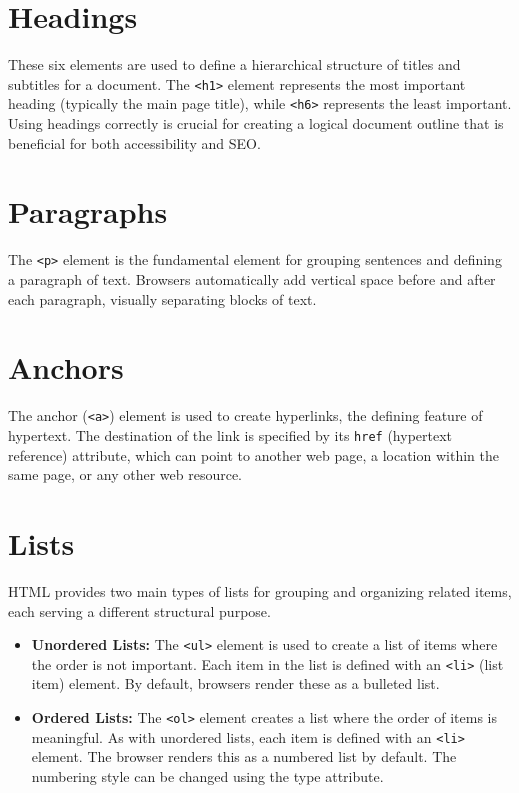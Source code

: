 \documentclass{scrbook}
\begin{document}
\section{Headings}

These six elements are used to define a hierarchical structure of titles and subtitles for a document. The \texttt{<h1>} element represents the most important heading (typically the main page title), while \texttt{<h6>} represents the least important. Using headings correctly is crucial for creating a logical document outline that is beneficial for both accessibility and SEO.

\section{Paragraphs}

The \texttt{<p>} element is the fundamental element for grouping sentences and defining a paragraph of text. Browsers automatically add vertical space before and after each paragraph, visually separating blocks of text.

\section{Anchors}

The anchor (\texttt{<a>}) element is used to create hyperlinks, the defining feature of hypertext. The destination of the link is specified by its \texttt{href} (hypertext reference) attribute, which can point to another web page, a location within the same page, or any other web resource.

\section{Lists}

HTML provides two main types of lists for grouping and organizing related items, each serving a different structural purpose.

\begin{itemize}
    \item
    \textbf{Unordered Lists:} The \texttt{<ul>} element is used to create a list of items where the order is not important. Each item in the list is defined with an \texttt{<li>} (list item) element. By default, browsers render these as a bulleted list.

    \item
    \textbf{Ordered Lists:} The \texttt{<ol>} element creates a list where the order of items is meaningful. As with unordered lists, each item is defined with an \texttt{<li>} element. The browser renders this as a numbered list by default. The numbering style can be changed using the type attribute.
\end{itemize}
\end{document}
